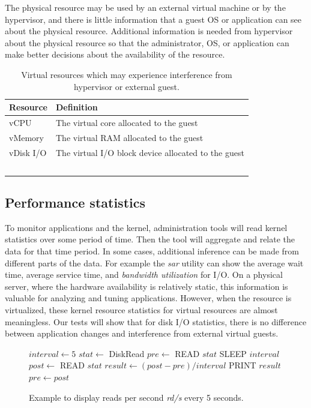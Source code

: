 The physical resource may be used by an external virtual machine or by the hypervisor, and there is little information that a guest OS or application can see about the physical resource.
Additional information is needed from hypervisor about the physical resource so that the administrator, OS, or application can make better decisions about the availability of the resource. 

\begin{table}[h]
  \begin{tabular}{ l p{10cm} }
    Resource & Definition \\
    \hline
    vCPU & The virtual core allocated to the guest \\
    vMemory & The virtual RAM allocated to the guest \\
    vDisk I/O & The virtual I/O block device allocated to the guest \\
    \hline
  \end{tabular}
\caption{Virtual resources which may experience interference from hypervisor or external guest.}
\label{tab:resources}
\end{table}

\subsection{Performance statistics}
To monitor applications and the kernel, administration tools will read kernel statistics over some period of time.  Then the tool will aggregate and relate the data for that time period.  In some cases, additional inference can be made from different parts of the data.  For example the \emph{sar} utility can show the average wait time, average service time, and \emph{bandwidth utilization} for I/O.  On a physical server, where the hardware availability is relatively static, this information is valuable for analyzing and tuning applications.  However, when the resource is virtualized, these kernel resource statistics for virtual resources are almost meaningless.  Our tests will show that for disk I/O statistics, there is no difference between application changes and interference from external virtual guests. 

\begin{figure}[h]
\begin{algorithmic}[H]
 \STATE $interval \gets 5$
 \STATE $stat \gets$  DiskRead       
 \STATE $pre \gets $ READ $stat$ 
 \LOOP
    \STATE SLEEP $interval$
    \STATE $post \gets$ READ $stat$
    \STATE $result \gets (post - pre)/interval$
    \STATE PRINT  $result$
    \STATE $pre \gets post$ 
 \ENDLOOP
\end{algorithmic}
\caption{Example to display reads per second \emph{rd/s} every 5 seconds.}
\label{alg1}
\end{figure}

